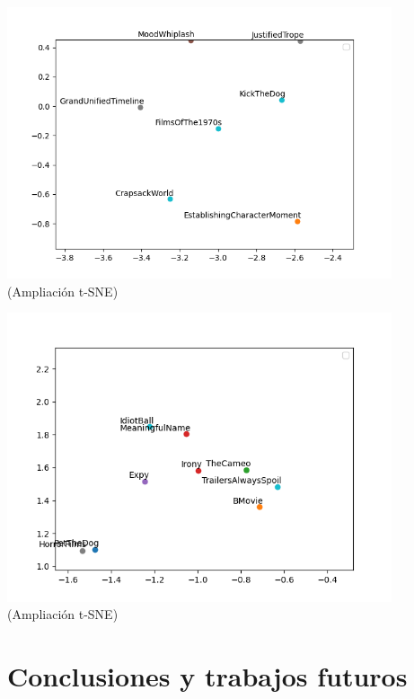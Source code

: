\documentclass{beamer}
\begin{document}
\begin{frame}
	\begin{center}
		\includegraphics[width=0.85\textwidth,keepaspectratio]{ampliacion_fecha.png}
		\\
		\footnotesize(Ampliación t-SNE)
    \end{center}
\end{frame}

\begin{frame}
	\begin{center}
		\includegraphics[width=0.85\textwidth,keepaspectratio]{meta.png}
		\\
		\footnotesize(Ampliación t-SNE)
    \end{center}
\end{frame}

\section{Conclusiones y trabajos futuros}
\end{document}
